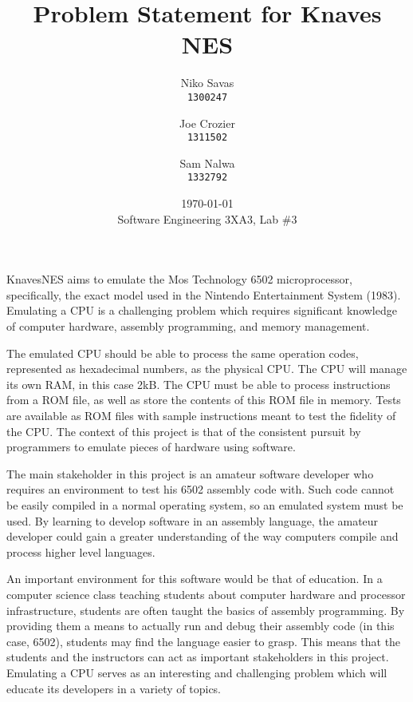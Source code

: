 \documentclass[12pt]{article}
\begin{document}
\title{Problem Statement for Knaves NES}
\date{\today\\
	{\medskip\small Software Engineering 3XA3, Lab \#3}
}
\author{Niko Savas\\
	\texttt{1300247}
	\and
	Joe Crozier\\
	\texttt{1311502}
	\and
	Sam Nalwa\\
	\texttt{1332792}
}
	
\maketitle

KnavesNES aims to emulate the Mos Technology 6502 microprocessor, specifically, the exact model used in the Nintendo Entertainment System (1983). Emulating a CPU is a challenging problem which requires significant knowledge of computer hardware, assembly programming, and memory management.

 The emulated CPU should be able to process the same operation codes, represented as hexadecimal numbers, as the physical CPU. The CPU will manage its own RAM, in this case 2kB. The CPU must be able to process instructions from a ROM file, as well as store the contents of this ROM file in memory. Tests are available as ROM files with sample instructions meant to test the fidelity of the CPU. The context of this project is that of the consistent pursuit by programmers to emulate pieces of hardware using software.

The main stakeholder in this project is an amateur software developer who requires an environment to test his 6502 assembly code with. Such code cannot be easily compiled in a normal operating system, so an emulated system must be used. By learning to develop software in an assembly language, the amateur developer could gain a greater understanding of the way computers compile and process higher level languages.

 An important environment for this software would be that of education. In a computer science class teaching students about computer hardware and processor infrastructure, students are often taught the basics of assembly programming. By providing them a means to actually run and debug their assembly code (in this case, 6502), students may find the language easier to grasp. This means that the students and the instructors can act as important stakeholders in this project. Emulating a CPU serves as an interesting and challenging problem which will educate its developers in a variety of topics.
\end{document}
